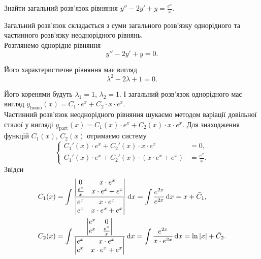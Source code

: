 \begin{example}
	Знайти загальний розв'язок рівняння $y'' - 2 y' + y = \frac{e^x}{x}$.
\end{example}

\begin{solution}
	Загальний розв'язок складається з суми загального роз\-в'яз\-ку однорідного та частинного роз\-в'яз\-ку неоднорідного рівнянь. \\

	Розглянемо однорідне рівняння
	\begin{equation*}
		y'' - 2 y' + y = 0.
	\end{equation*}
	
	Його характеристичне рівняння має вигляд
	\begin{equation*}
		\lambda^2 - 2 \lambda + 1 = 0.
	\end{equation*}

	Його коренями будуть $\lambda_1 = 1$, $\lambda_2 = 1$. І загальний роз\-в'яз\-ок однорідного має вигляд $y_{\text{homo}}(x) = C_1 \cdot e^x + C_2 \cdot x \cdot e^x$.  \\

	Частинний розв’язок неоднорідного рівняння шукаємо методом варіації довільної сталої у вигляді $y_{\text{part}}(x) = C_1(x) \cdot e^x + C_2(x) \cdot x \cdot e^x$. Для знаходження функцій $C_1(x)$, $C_2(x)$ отримаємо систему 
	\begin{equation*}
		\left\{
			\begin{aligned}
				C_1'(x) \cdot e^x + C_2'(x) \cdot x \cdot e^x &= 0, \\
				C_1'(x) \cdot e^x + C_2'(x) \cdot \left( x \cdot e^x + e^x \right) &= \frac{e^x}{x}.
			\end{aligned}
		\right.
	\end{equation*}
	Звідси
	\begin{align*}
		C_1(x) &= \int \frac{\begin{vmatrix} 0 & x \cdot e^x \\ \frac{e^x}{x} & x \cdot e^x + e^x \end{vmatrix}}{\begin{vmatrix} e^x & x \cdot e^x \\ e^x & x \cdot e^x + e^x \end{vmatrix}} \mathop{}\!\mathrm{d} x = \int \frac{e^{2x}}{e^{2x}} \mathop{}\!\mathrm{d} x = x + \bar C_1, \\
		C_2(x) &= \int \frac{\begin{vmatrix} e^x & 0 \\ e^x & \frac{e^x}{x} \end{vmatrix}}{\begin{vmatrix} e^x & x \cdot e^x \\ e^x & x \cdot e^x + e^x \end{vmatrix}} \mathop{}\!\mathrm{d} x = \int \frac{e^{2x}}{x \cdot e^{2x}} \mathop{}\!\mathrm{d} x = \ln |x| + \bar C_2.
	\end{align*}


\end{solution}
